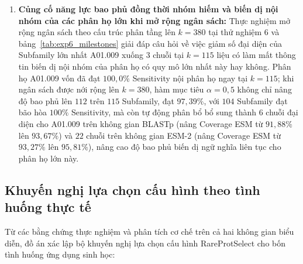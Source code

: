 \begin{enumerate}
    \item \textbf{Củng cố năng lực bao phủ đồng thời nhóm hiếm và biến dị nội nhóm của các phân họ lớn khi mở rộng ngân sách:} Thực nghiệm mở rộng ngân sách theo cấu trúc phân tầng lên $k = 380$ tại thử nghiệm 6 và bảng~\ref{tab:exp6_milestones} giải đáp câu hỏi về việc giảm số đại diện của Subfamily lớn nhất A01.009 xuống $3$ chuỗi tại $k = 115$ liệu có làm mất thông tin biến dị nội nhóm của phân họ có quy mô lớn nhất này hay không. Phân họ A01.009 vốn đã đạt $100{,}0\%$ Sensitivity nội phân họ ngay tại $k = 115$; khi ngân sách được nới rộng lên $k = 380$, hàm mục tiêu $\alpha = 0{,}5$ không chỉ nâng độ bao phủ lên $112$ trên $115$ Subfamily, đạt $97{,}39\%$, với $104$ Subfamily đạt bão hòa $100\%$ Sensitivity, mà còn tự động phân bổ bổ sung thành $6$ chuỗi đại diện cho A01.009 trên không gian BLASTp (nâng Coverage ESM từ $91{,}88\%$ lên $93{,}67\%$) và $22$ chuỗi trên không gian ESM-2 (nâng Coverage ESM từ $93{,}27\%$ lên $95{,}81\%$), nâng cao độ bao phủ biến dị ngữ nghĩa liên tục cho phân họ lớn này.
\end{enumerate}

\subsection{Khuyến nghị lựa chọn cấu hình theo tình huống thực tế}
\label{subsec:conc_config_guidelines}

Từ các bằng chứng thực nghiệm và phân tích cơ chế trên cả hai không gian biểu diễn, đồ án xác lập bộ khuyến nghị lựa chọn cấu hình RareProtSelect cho bốn tình huống ứng dụng sinh học:

